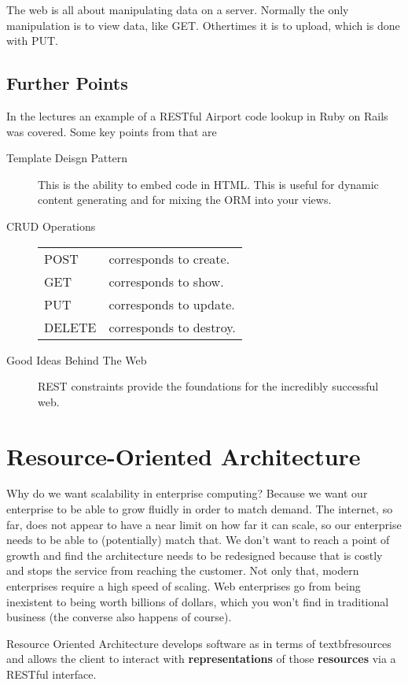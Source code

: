 \documentclass[11pt]{article}
\begin{document}
The web is all about manipulating data on a server. Normally the only manipulation is to view data, like GET. Othertimes it is to upload, which is done with PUT.

\subsection{Further Points}
In the lectures an example of a RESTful Airport code lookup in Ruby on Rails was covered. Some key points from that are
\begin{description}
  \item[Template Deisgn Pattern] This is the ability to embed code in HTML. This is useful for dynamic content generating and for mixing the ORM into your views.
  \item[CRUD Operations]
  \begin{tabular}{l l}
    POST & corresponds to create. \\
    GET & corresponds to show. \\
    PUT & corresponds to update. \\
    DELETE & corresponds to destroy. \\
  \end{tabular}
  \item[Good Ideas Behind The Web] REST constraints provide the foundations for the incredibly successful web.
\end{description}



\section{Resource-Oriented Architecture}

Why do we want scalability in enterprise computing? Because we want our enterprise to be able to grow fluidly in order to match demand. The internet, so far, does not appear to have a near limit on how far it can scale, so our enterprise needs to be able to (potentially) match that. We don’t want to reach a point of growth and find the architecture needs to be redesigned because that is costly and stops the service from reaching the customer. Not only that, modern enterprises require a high speed of scaling. Web enterprises go from being inexistent to being worth billions of dollars, which you won't find in traditional business (the converse also happens of course).

Resource Oriented Architecture develops software as in terms of textbf{resources} and allows the client to interact with \textbf{representations} of those \textbf{resources} via a RESTful interface.
\end{document}
